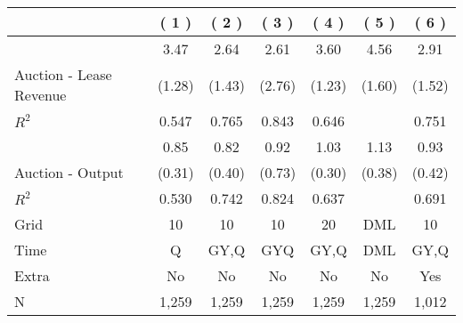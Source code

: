 
\begin{tabular}{lcccccc}
\toprule
  & ( 1 ) & ( 2 ) & ( 3 ) & ( 4 ) & ( 5 ) & ( 6 )\\
\midrule
 & 3.47 & 2.64 & 2.61 & 3.60 & 4.56 & 2.91\\

\multirow{-2}{*}{\raggedright\arraybackslash Auction - Lease Revenue} & (1.28) & (1.43) & (2.76) & (1.23) & (1.60) & (1.52)\\

$R^2$ & 0.547 & 0.765 & 0.843 & 0.646 &  & 0.751\\

\midrule
 & 0.85 & 0.82 & 0.92 & 1.03 & 1.13 & 0.93\\

\multirow{-2}{*}{\raggedright\arraybackslash Auction - Output} & (0.31) & (0.40) & (0.73) & (0.30) & (0.38) & (0.42)\\

$R^2$ & 0.530 & 0.742 & 0.824 & 0.637 &  & 0.691\\

\midrule
Grid & 10 & 10 & 10 & 20 & DML & 10\\

Time & Q & GY,Q & GYQ & GY,Q & DML & GY,Q\\

Extra & No & No & No & No & No & Yes\\

N & 1,259 & 1,259 & 1,259 & 1,259 & 1,259 & 1,012\\
\bottomrule
\end{tabular}
